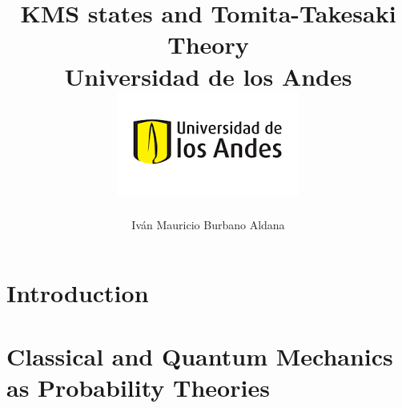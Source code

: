 \documentclass[12pt]{report}
\title 
{
	{KMS states and Tomita-Takesaki Theory}\\
	{\large Universidad de los Andes}\\
	{\includegraphics{logo.png}}	
}
\author{Iván Mauricio Burbano Aldana}
\begin{document}
	\maketitle

\chapter{Introduction}

\chapter{Classical and Quantum Mechanics as Probability Theories}

\end{document}
